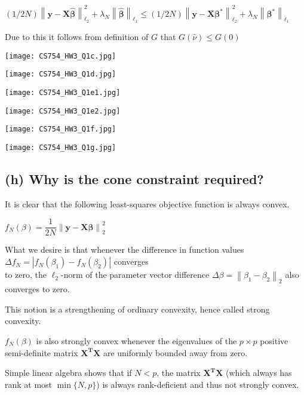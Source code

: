 \documentclass[fleqn, 11pt]{article}
\newcommand{\bs}[1]{\boldsymbol{#1}}
\newcommand\norm[1]{\left\lVert#1\right\rVert}
\begin{document}
\begin{center}
    
$(1/2N) \norm{\bs{y-X \hat{\beta}}}_{\ell_2}^2 + \lambda_N \norm{\hat{\bs{\beta}}}_{\ell_1}  
\leq  (1/2N) \norm{\bs{y-X \beta^*}}_{\ell_2}^2 + \lambda_N \norm{\bs{\beta}^*}_{\ell_1} $

\end{center}


Due to this it follows from definition of $G$ that $G(\hat{\nu}) \leq G(0)$

\newpage
\texttt{[image: CS754\_HW3\_Q1c.jpg]}

\newpage
\texttt{[image: CS754\_HW3\_Q1d.jpg]}

\newpage
\texttt{[image: CS754\_HW3\_Q1e1.jpg]}


\texttt{[image: CS754\_HW3\_Q1e2.jpg]}

\newpage
\texttt{[image: CS754\_HW3\_Q1f.jpg]}

\newpage
\texttt{[image: CS754\_HW3\_Q1g.jpg]}

\newpage

\subsection*{(h) Why is the cone constraint required? }

It is clear that the following least-squares objective function is always convex.

\begin{center}
    $f_N(\beta) = \dfrac{1}{2N} \norm{\bs{y - X \beta}}_2^2$
\end{center}


What we desire is that whenever the difference in function values $\Delta f_N = | f_N(\beta_1) - f_N(\beta_2) |  $
converges \\ to zero, the $\ell_2$-norm
of the parameter vector difference $\Delta \beta = \norm{ \beta_1 - \beta_2 }_2    $ also converges to zero. 

\smallskip

This notion is a strengthening of ordinary
convexity, hence called strong convexity.

\medskip

$f_N(\beta)$ is also strongly convex whenever the eigenvalues of the 
$p \times p$ positive semi-definite matrix $\bs{X^TX}$ 
are uniformly bounded away from zero.

\smallskip 

Simple linear algebra shows that if $N < p$, the matrix $\bs{X^TX}$ (which always has 
rank at most $\min\{N, p\}$) is always rank-deficient and thus not strongly convex.
\end{document}

